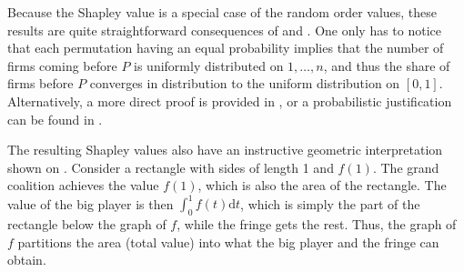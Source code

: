 \documentclass[a4paper]{article}
\newcommand{\dt}{\mathrm{d}t}
\begin{document}
Because the Shapley value is a special case of the random order values, these results are quite straightforward consequences of  and .
One only has to notice that each permutation having an equal probability implies that the number of firms coming before $P$ is uniformly distributed on $1, \dots, n$, and thus the share of firms before $P$ converges in distribution to the uniform distribution on $[0, 1]$.
Alternatively, a more direct proof is provided in , or a probabilistic justification can be found in \textcite{levy1997individual}.

The resulting Shapley values also have an instructive geometric interpretation shown on .
Consider a rectangle with sides of length 1 and $f(1)$.
The grand coalition achieves the value $f(1)$, which is also the area of the rectangle.
The value of the big player is then $\int_0^1 f(t) \dt$, which is simply the part of the rectangle below the graph of $f$, while the fringe gets the rest.
Thus, the graph of $f$ partitions the area (total value) into what the big player and the fringe can obtain.
\end{document}
